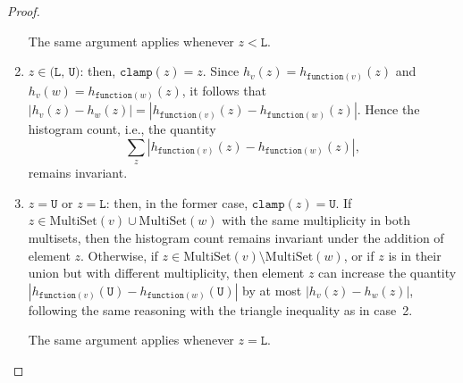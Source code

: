 \documentclass[11pt,a4paper]{article}
\theoremstyle{definition}
\newcommand{\MultiSet}{\mathrm{MultiSet}}
\newcommand{\clamp}{\texttt{clamp}}
\newcommand{\function}{\texttt{function}}
\newcommand{\silvia}[1]{{ {\color{blue}{(silvia)~#1}}}}
\begin{document}
\begin{proof}
\begin{enumerate}
    
    
    The same argument applies whenever $z < \texttt{L}$. 
    
    \silvia{The first subcase discussed here, i.e., when $k_v = k_w$, is also proven by the triangle inequality expression above, but it seemed clean to separate the case where the total sum remains invariant.}
    
    \item $z \in \texttt{(L, U)}$: then, $\clamp(z) = z$. Since $h_v(z) = h_{\function(v)}(z)$ and $h_v(w) = h_{\function(w)}(z)$, it follows that $|h_v(z) - h_w(z)| = |h_{\function(v)}(z) - h_{\function(w)}(z)|$. Hence the histogram count, i.e., the quantity
     \[
        \sum_z |h_{\function(v)}(z) - h_{\function(w)}(z)|,
    \]
    remains invariant.
    
    
    \item $z = \texttt{U}$ or $z = \texttt{L}$: then, in the former case, $\clamp(z) = \texttt{U}$. If $z \in \MultiSet(v) \cup \MultiSet(w)$ with the same multiplicity in both multisets, then the histogram count remains invariant under the addition of element $z$. Otherwise, if $z \in \MultiSet(v) \setminus \MultiSet(w)$, or if $z$ is in their union but with different multiplicity, then element $z$ can increase the quantity $|h_{\function(v)}(\texttt{U}) - h_{\function(w)}(\texttt{U})|$ by at most $|h_v(z)-h_w(z)|$, following the same reasoning with the triangle inequality as in case~2.
    
    The same argument applies whenever $z = \texttt{L}$.
\end{enumerate}


\end{proof}
\end{document}
